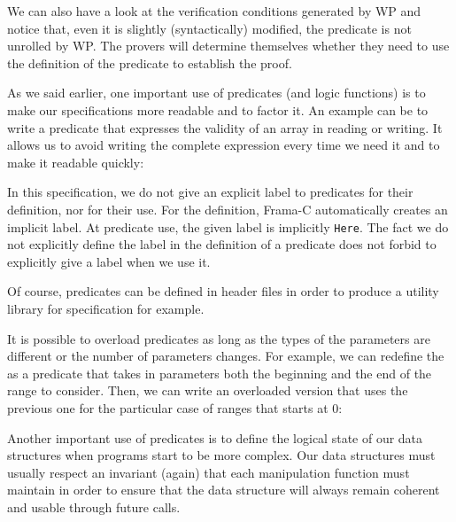We can also have a look at the verification conditions generated by WP and
notice that, even it is slightly (syntactically) modified, the predicate is not
unrolled by WP. The provers will determine themselves whether they need to use
the definition of the predicate to establish the proof.






As we said earlier, one important use of predicates (and logic
functions) is to make our specifications more readable and to factor it.
An example can be to write a predicate that expresses the validity of an
array in reading or writing. It allows us to avoid writing the complete
expression every time we need it and to make it readable quickly:






In this specification, we do not give an explicit label to predicates
for their definition, nor for their use. For the definition, Frama-C
automatically creates an implicit label. At predicate use, the given
label is implicitly \texttt{Here}. The fact we do not explicitly define
the label in the definition of a predicate does not forbid to explicitly
give a label when we use it.

Of course, predicates can be defined in header files in order to produce
a utility library for specification for example.






It is possible to overload predicates as long as the types of the
parameters are different or the number of parameters changes. For
example, we can redefine the  as a
predicate that takes in parameters both the beginning and the end
of the range to consider. Then, we can write an overloaded version that
uses the previous one for the particular case of ranges that starts
at 0:









Another important use of predicates is to define the logical state of
our data structures when programs start to be more complex. Our data
structures must usually respect an invariant (again) that each
manipulation function must maintain in order to ensure that the data
structure will always remain coherent and usable through future calls.



